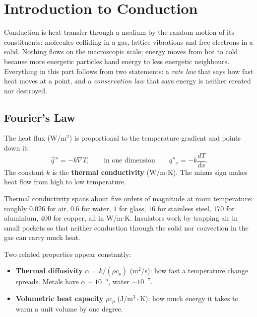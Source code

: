 \section*{Introduction to Conduction}

Conduction is heat transfer through a medium by the random motion of its constituents: molecules colliding in a gas, lattice vibrations and free electrons in a solid. Nothing flows on the macroscopic scale; energy moves from hot to cold because more energetic particles hand energy to less energetic neighbours. Everything in this part follows from two statements: a \emph{rate law} that says how fast heat moves at a point, and a \emph{conservation law} that says energy is neither created nor destroyed.

\subsection*{Fourier's Law}

\begin{definition}
The heat flux (W/m$^2$) is proportional to the temperature gradient and points down it:
\[
\vec{q}'' = -k \nabla T ,
\qquad\text{in one dimension}\qquad
q''_x = -k \frac{dT}{dx}.
\]
The constant $k$ is the \textbf{thermal conductivity} (W/m$\cdot$K). The minus sign makes heat flow from high to low temperature.
\end{definition}

Thermal conductivity spans about five orders of magnitude at room temperature: roughly $0.026$ for air, $0.6$ for water, $1$ for glass, $16$ for stainless steel, $170$ for aluminium, $400$ for copper, all in W/m$\cdot$K. Insulators work by trapping air in small pockets so that neither conduction through the solid nor convection in the gas can carry much heat.

Two related properties appear constantly:
\begin{itemize}
    \item \textbf{Thermal diffusivity} $\alpha = k/(\rho c_p)$ (m$^2$/s): how fast a temperature change spreads. Metals have $\alpha \sim 10^{-5}$, water $\sim 10^{-7}$.
    \item \textbf{Volumetric heat capacity} $\rho c_p$ (J/m$^3\cdot$K): how much energy it takes to warm a unit volume by one degree.
\end{itemize}

